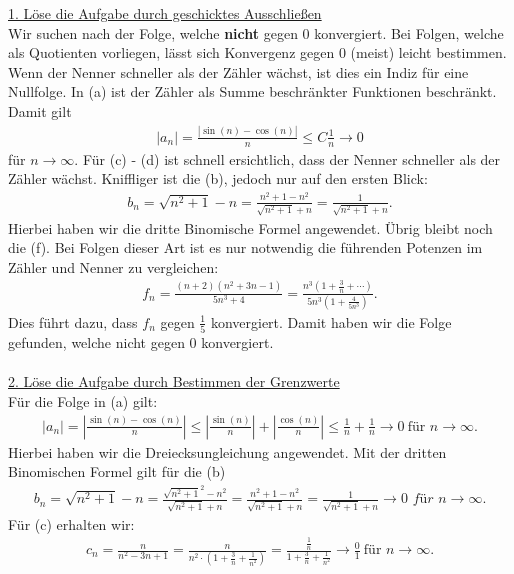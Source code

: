 \underline{1. Löse die Aufgabe durch geschicktes Ausschließen} \\
Wir suchen nach der Folge, welche \textbf{nicht} gegen $0$ konvergiert.
Bei Folgen, welche als Quotienten vorliegen, lässt sich Konvergenz gegen $0$ (meist) leicht bestimmen. Wenn der Nenner schneller als der Zähler wächst, ist dies ein Indiz für eine Nullfolge.
In (a) ist der Zähler als Summe beschränkter Funktionen beschränkt. Damit gilt
\begin{align*}
	|a_n | = \frac{|\sin(n) - \cos(n)| }{n} 
	\leq C \frac{1}{n} \to 0
\end{align*}
für $n \to \infty$. Für (c) - (d) ist schnell ersichtlich, dass der Nenner schneller als der Zähler wächst. Kniffliger ist die (b), jedoch nur auf den ersten Blick:
\begin{align*}
	b_n = \sqrt{n^2 +1} - n
	= \frac{n^2 +1  - n^2}{\sqrt{n^2 +1 } + n}
	=
	\frac{1}{\sqrt{n^2 +1 } + n}.
\end{align*}
Hierbei haben wir die dritte Binomische Formel angewendet. 
Übrig bleibt noch die (f). Bei Folgen dieser Art ist es nur notwendig die führenden Potenzen im Zähler und Nenner zu vergleichen:
\begin{align*}
	f_n = \frac{(n+2) (n^2 + 3n -1 )}{5n^3 + 4} 
	= 
	\frac{n^3 \left(1+ \frac{3}{n} + \cdots  \right)}{5n^3 \left(1 + \frac{4}{5 n^3} \right)}.
\end{align*}
Dies führt dazu, dass $f_n $ gegen $\frac{1}{5}$ konvergiert. Damit haben wir die Folge gefunden, welche nicht gegen $0$ konvergiert.\\
\\
\underline{2. Löse die Aufgabe durch Bestimmen der Grenzwerte} \\
Für die Folge in (a) gilt:
\begin{align*}
	|a_n| =
	\left|
	\frac{\sin(n) - \cos(n)}{n}
	\right|
	\leq
	\left|
	\frac{\sin(n)}{n}
	\right|
	+
	\left|
	\frac{\cos(n)}{n}
	\right|
	\leq 
	\frac{1}{n} + \frac{1}{n} \to 0 \ \textrm{für } n \to \infty.
\end{align*}
Hierbei haben wir die Dreiecksungleichung angewendet. Mit der dritten Binomischen Formel gilt für die (b)
\begin{align*}
	b_n = \sqrt{n^2 +1} - n
	= \frac{\sqrt{n^2 +1}^2  - n^2}{\sqrt{n^2 +1 } + n}
	= \frac{n^2 +1  - n^2}{\sqrt{n^2 +1 } + n}
	=
	\frac{1}{\sqrt{n^2 +1 } + n} \to 0 \textit{ für } n \to \infty.
\end{align*}
Für (c) erhalten wir:
\begin{align*}
	  c_n = \frac{n}{n^2 - 3n +1 }
	  = \frac{n}{n^2 \cdot \left( 1+ \frac{3}{n} + \frac{1}{n^2}\right)}
	  =
	  \frac{\frac{1}{n}}{   1 + \frac{3}{n} + \frac{1}{n^2}}
	  \to \frac{0}{1} \ \textrm{für } n \to \infty.
\end{align*}
